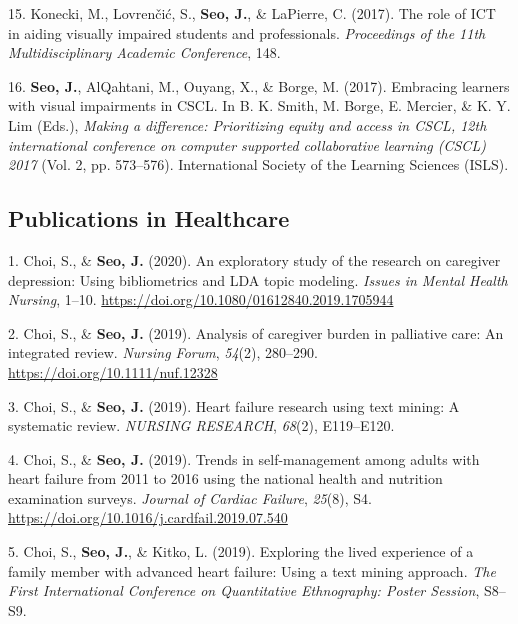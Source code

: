 \documentclass[11pt,a4paper,]{awesome-cv}
\begin{document}
\leavevmode{}%
15. Konecki, M., Lovrenčić, S., \textbf{Seo, J.}, \& LaPierre, C.
(2017). The role of ICT in aiding visually impaired students and
professionals. \emph{Proceedings of the 11th Multidisciplinary Academic
Conference}, 148.

\leavevmode{}%
16. \textbf{Seo, J.}, AlQahtani, M., Ouyang, X., \& Borge, M. (2017).
Embracing learners with visual impairments in CSCL. In B. K. Smith, M.
Borge, E. Mercier, \& K. Y. Lim (Eds.), \emph{Making a difference:
Prioritizing equity and access in CSCL, 12th international conference on
computer supported collaborative learning (CSCL) 2017} (Vol. 2, pp.
573--576). International Society of the Learning Sciences (ISLS).

\hypertarget{publications-in-healthcare}{%
\subsection{Publications in
Healthcare}\label{publications-in-healthcare}}

\hypertarget{bibliography}{}
\leavevmode{}%
1. Choi, S., \& \textbf{Seo, J.} (2020). An exploratory study of the
research on caregiver depression: Using bibliometrics and LDA topic
modeling. \emph{Issues in Mental Health Nursing}, 1--10.
\url{https://doi.org/10.1080/01612840.2019.1705944}

\leavevmode{}%
2. Choi, S., \& \textbf{Seo, J.} (2019). Analysis of caregiver burden in
palliative care: An integrated review. \emph{Nursing Forum},
\emph{54}(2), 280--290. \url{https://doi.org/10.1111/nuf.12328}

\leavevmode{}%
3. Choi, S., \& \textbf{Seo, J.} (2019). Heart failure research using
text mining: A systematic review. \emph{NURSING RESEARCH}, \emph{68}(2),
E119--E120.

\leavevmode{}%
4. Choi, S., \& \textbf{Seo, J.} (2019). Trends in self-management among
adults with heart failure from 2011 to 2016 using the national health
and nutrition examination surveys. \emph{Journal of Cardiac Failure},
\emph{25}(8), S4. \url{https://doi.org/10.1016/j.cardfail.2019.07.540}

\leavevmode{}%
5. Choi, S., \textbf{Seo, J.}, \& Kitko, L. (2019). Exploring the lived
experience of a family member with advanced heart failure: Using a text
mining approach. \emph{The First International Conference on
Quantitative Ethnography: Poster Session}, S8--S9.
\end{document}
